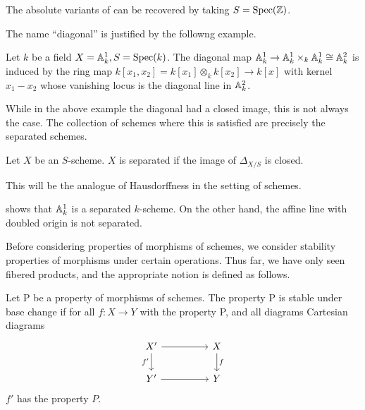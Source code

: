 \begin{remark}
    The absolute variants of  can be recovered by taking $S=\operatorname{Spec}(\mathbb{Z})$. 
\end{remark}
The name ``diagonal'' is justified by the followng example. 
\begin{example}\label{ex: A1 is separated}
    Let $k$ be a field $X=\mathbb{A}^{1}_{k},S=\operatorname{Spec}(k)$. The diagonal map $\mathbb{A}^{1}_{k}\to \mathbb{A}^{1}_{k}\times_{k}\mathbb{A}^{1}_{k}\cong\mathbb{A}^{2}_{k}$ is induced by the ring map $k[x_{1},x_{2}]=k[x_{1}]\otimes_{k}k[x_{2}]\to k[x]$ with kernel $x_{1}-x_{2}$ whose vanishing locus is the diagonal line in $\mathbb{A}^{2}_{k}$. 
\end{example}
While in the above example the diagonal had a closed image, this is not always the case. The collection of schemes where this is satisfied are precisely the separated schemes. 
\begin{definition}\label{def: separated scheme}
    Let $X$ be an $S$-scheme. $X$ is separated if the image of $\Delta_{X/S}$ is closed. 
\end{definition}
\begin{remark}
    This will be the analogue of Hausdorffness in the setting of schemes. 
\end{remark}
\begin{example}
     shows that $\mathbb{A}^{1}_{k}$ is a separated $k$-scheme. On the other hand, the affine line with doubled origin  is not separated. 
\end{example}
Before considering properties of morphisms of schemes, we consider stability properties of morphisms under certain operations. Thus far, we have only seen fibered products, and the appropriate notion is defined as follows. 
\begin{definition}\label{def: stable under base change}
    Let P be a property of morphisms of schemes. The property P is stable under base change if for all $f:X\to Y$ with the property P, and all diagrams Cartesian diagrams 
    $$%
    \begin{tikzcd}
        {X'} && X \\
        {Y'} && Y
        \arrow[from=1-1, to=1-3]
        \arrow["{f'}"', from=1-1, to=2-1]
        \arrow["f", from=1-3, to=2-3]
        \arrow[from=2-1, to=2-3]
    \end{tikzcd}$$
    $f'$ has the property $P$. 
\end{definition}

